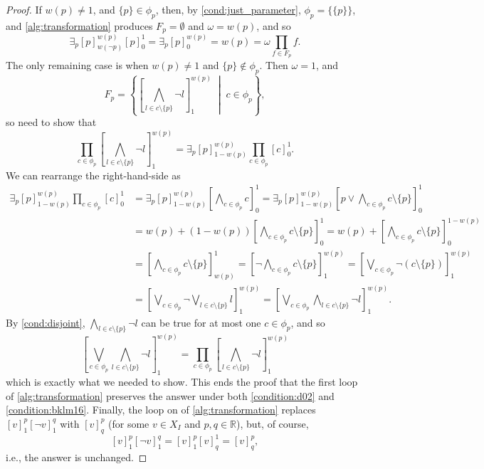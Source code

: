 \documentclass[runningheads]{llncs}
\begin{document}
\begin{proof}
  If $w(p) \ne 1$, and $\{ p \} \in \phi_p$, then, by
  \cref{cond:just_parameter}, $\phi_p = \{ \{ p \} \}$, and
  \cref{alg:transformation} produces $F_p = \emptyset$ and $\omega = w(p)$, and
  so
  \[
    \exists_p [p]_{w(\neg p)}^{w(p)} [p]_0^1 = \exists_p [p]^{w(p)}_0 = w(p) =
    \omega \prod_{f \in F_p} f.
  \]
  The only remaining case is when $w(p) \ne 1$ and $\{ p \} \not \in \phi_p$.
  Then $\omega = 1$, and
  \[
    F_p = \left\{ \left[\bigwedge_{l \in c \setminus \{ p \}} \neg
        l\right]_1^{w(p)} \;\middle|\; c \in \phi_p \right\},
  \]
  so need to show that
  \[
    \prod_{c \in \phi_p} \left[\bigwedge_{l \in c \setminus \{ p \}} \neg
      l\right]_1^{w(p)} = \exists_p [p]_{1-w(p)}^{w(p)} \prod_{c \in \phi_p}
    [c]_0^1.
  \]
  We can rearrange the right-hand-side as
  \begin{align*}
    \exists_p [p]_{1-w(p)}^{w(p)} \prod_{c \in \phi_p} [c]_0^1 &= \exists_p [p]_{1-w(p)}^{w(p)} \left[\bigwedge_{c \in \phi_p} c\right]_0^1 = \exists_p [p]_{1-w(p)}^{w(p)} \left[ p \lor \bigwedge_{c \in \phi_p} c \setminus \{ p \} \right]_0^1 \\
                                                               &= w(p) + (1-w(p)) \left[ \bigwedge_{c \in \phi_p} c \setminus \{ p \} \right]_0^1 = w(p) + \left[ \bigwedge_{c \in \phi_p} c \setminus \{ p \} \right]_0^{1-w(p)} \\
                                                               &= \left[ \bigwedge_{c \in \phi_p} c \setminus \{ p \} \right]_{w(p)}^1 = \left[ \neg \bigwedge_{c \in \phi_p} c \setminus \{ p \} \right]_1^{w(p)} = \left[ \bigvee_{c \in \phi_p} \neg(c \setminus \{ p \}) \right]_1^{w(p)} \\
                                                               &= \left[ \bigvee_{c \in \phi_p} \neg \bigvee_{l \in c \setminus \{ p \}} l \right]_1^{w(p)} = \left[ \bigvee_{c \in \phi_p} \bigwedge_{l \in c \setminus \{ p \}} \neg l \right]_1^{w(p)}.
  \end{align*}
   By \cref{cond:disjoint}, $\bigwedge_{l \in c \setminus \{ p \}} \neg l$ can
   be true for at most one $c \in \phi_p$, and so
   \[
     \left[ \bigvee_{c \in \phi_p} \bigwedge_{l \in c \setminus \{ p \}} \neg l
     \right]_1^{w(p)} = \prod_{c \in \phi_p} \left[ \bigwedge_{l \in c \setminus
         \{ p \}} \neg l \right]_1^{w(p)}
   \]
   which is exactly what we needed to show. This ends the proof that the
   first loop of \cref{alg:transformation} preserves the answer under both
   \cref{condition:d02} and \cref{condition:bklm16}. Finally, the loop on
    of \cref{alg:transformation}
   replaces $[v]_1^p[\neg v]_1^q$ with $[v]_q^p$ (for some $v \in X_I$ and $p, q
   \in \mathbb{R}$), but, of course,
   \[
     [v]_1^p[\neg v]_1^q = [v]_1^p[v]_q^1 = [v]_q^p,
   \]
   i.e., the answer is unchanged.
\end{proof}
\end{document}
